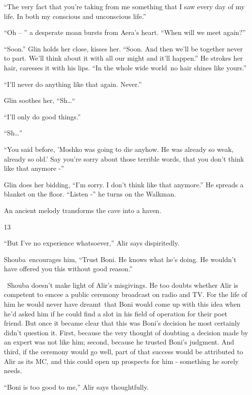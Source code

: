 \documentclass[twoside,11pt]{book}
\begin{document}
``The very fact that you're taking from me something that I saw every day of my life. In both my conscious
and unconscious life.''

``Oh -- '' a desperate moan bursts from Aera's heart. ``When will we meet
again?'' 

``Soon.'' Glin holds her close, kisses her. ``Soon. And then we'll be together
never to part. We'll think about it with all our might and it'll happen.'' He strokes her hair, caresses
it with his lips. ``In the whole wide world~no hair shines like yours.''

``I'll never do anything like that again. Never.'' 

Glin soothes her, ``Sh{\dots}``~ 

``I'll only do good things.'' 

``Sh{\dots}'' 

``You said before, 'Moshko was going to die anyhow. He was already so weak, already so old.' Say you're
sorry about those terrible words, that you don't think like that anymore -'' 

Glin does her bidding, ``I'm sorry. I don't think like that anymore.'' He spreads a blanket on
the floor. ``Listen -'' he turns on the Walkman.

An ancient melody transforms the cave into a haven.\ 


\bigskip

13

``But I've no experience whatsoever,'' Alir says dispiritedly.

Shouba\ encourages him, ``Trust Boni. He knows what he's doing. He wouldn't have offered you this without
good reason.'' 

~Shouba doesn't make light of Alir's misgivings. He too doubts whether Alir is competent to emcee a public ceremony
broadcast on radio and TV. For the life of him he would never have dreamt~that Boni would come up with this idea when
he'd asked him if he could find a slot in his field of operation for their poet friend. But once it became clear that
this was Boni's decision he most certainly didn't question it. First, because the very thought of doubting a decision
made by an expert was not like him; second, because he trusted Boni's judgment. And third, if the ceremony would go
well, part of that success would be attributed to Alir as its MC, and this could open up prospects for him - something
he sorely needs.

``Boni is too good to me,'' Alir says thoughtfully.
\end{document}
